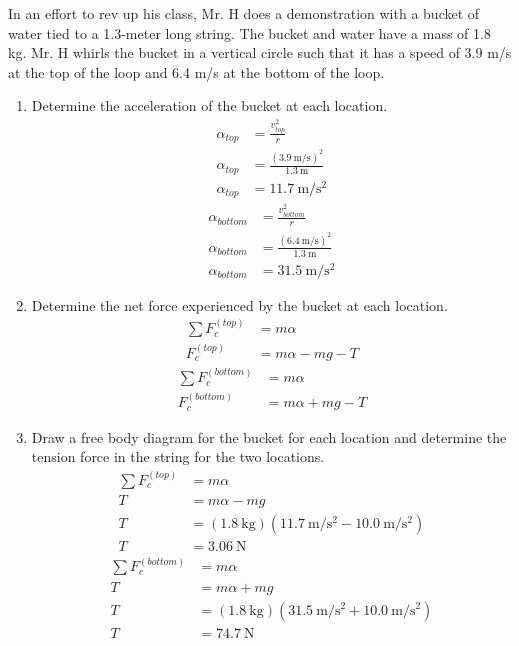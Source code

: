 \documentclass{article}
\begin{document}
In an effort to rev up his class, Mr. H does a demonstration with a bucket of water tied to a 1.3-meter long string. The bucket and water have a mass of 1.8 kg. Mr. H whirls the bucket in a vertical circle such that it has a speed of 3.9 m/s at the top of the loop and 6.4 m/s at the bottom of the loop.
\begin{enumerate}[label = \textbf{\alph*.}]
	\item Determine the acceleration of the bucket at each location.
		\begin{align*}
			\alpha_{top} & = \frac{ v_{top}^2 }{ r } \\
			\alpha_{top} & = \frac{ (\SI{3.9}{\meter \per \second})^2 }{ \SI{1.3}{\meter} } \\
			\alpha_{top} & = \SI{11.7}{\meter \per \second \squared}
		\end{align*}
		\begin{align*}
			\alpha_{bottom} & = \frac{ v_{bottom}^2 }{ r } \\
			\alpha_{bottom} & = \frac{ (\SI{6.4}{\meter \per \second})^2 }{ \SI{1.3}{\meter} } \\
			\alpha_{bottom} & = \SI{31.5}{\meter \per \second \squared}
		\end{align*}
	\item Determine the net force experienced by the bucket at each location.
		\begin{align*}
			\sum F_c^{(top)} & = m\alpha \\
			F_c^{(top)} & = m\alpha - mg - T
		\end{align*}
		\begin{align*}
			\sum F_c^{(bottom)} & = m\alpha \\
			F_c^{(bottom)} & = m\alpha + mg - T
		\end{align*}
	\item Draw a free body diagram for the bucket for each location and determine the tension force in the string for the two locations.
		\begin{align*}
			\sum F_c^{(top)} & = m\alpha \\
			T & = m\alpha - mg \\
			T & = (\SI{1.8}{\kilogram})(\SI{11.7}{\meter \per \second \squared} - \SI{10.0}{\meter \per \second \squared}) \\
			T & = \SI{3.06}{\newton}
		\end{align*}
		\begin{align*}
			\sum F_c^{(bottom)} & = m\alpha \\
			T & = m\alpha + mg \\
			T & = (\SI{1.8}{\kilogram})(\SI{31.5}{\meter \per \second \squared} + \SI{10.0}{\meter \per \second \squared}) \\
			T & = \SI{74.7}{\newton}
		\end{align*}
\end{enumerate}
\end{document}
